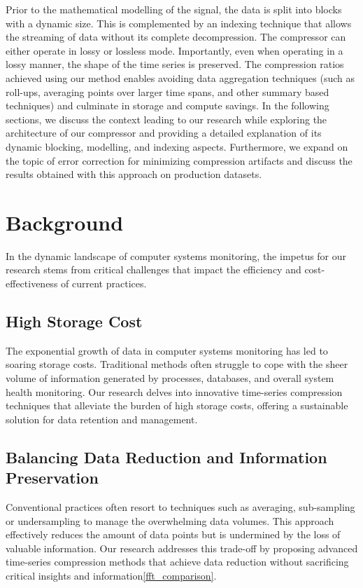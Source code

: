 \documentclass[conference]{IEEEtran}
\begin{document}
Prior to the mathematical modelling of the signal, the data is split into blocks with a dynamic size.
This is complemented by an indexing technique that allows the streaming of data without its complete decompression.
The compressor can either operate in lossy or lossless mode. Importantly, even when operating in a lossy manner, the shape of the time series is preserved.
The compression ratios achieved using our method enables avoiding data aggregation techniques (such as roll-ups, averaging points over larger time spans, and other summary based techniques) and culminate in storage and compute savings.
In the following sections, we discuss the context leading to our research while exploring the architecture of our compressor and providing a detailed explanation of its dynamic blocking, modelling, and indexing aspects. Furthermore, we expand on the topic of error correction for minimizing compression artifacts and discuss the results obtained with this approach on production datasets.

\section{Background}

In the dynamic landscape of computer systems monitoring, the impetus for our research stems from critical challenges that impact the efficiency and cost-effectiveness of current practices\cite{10.1007/978-3-319-63712-9_8}. 

\subsection{High Storage Cost}

The exponential growth of data in computer systems monitoring has led to soaring storage costs.
Traditional methods often struggle to cope with the sheer volume of information generated by processes, databases, and overall system health monitoring.
Our research delves into innovative time-series compression techniques that alleviate the burden of high storage costs, offering a sustainable solution for data retention and management. 

\subsection{Balancing Data Reduction and Information Preservation}
Conventional practices often resort to techniques such as averaging, sub-sampling or undersampling to manage the overwhelming data volumes. This approach effectively reduces the amount of data points but is undermined by the loss of valuable information.
Our research addresses this trade-off by proposing advanced time-series compression methods that achieve data reduction without sacrificing critical insights and information\ref{fft_comparison}. 
\end{document}
